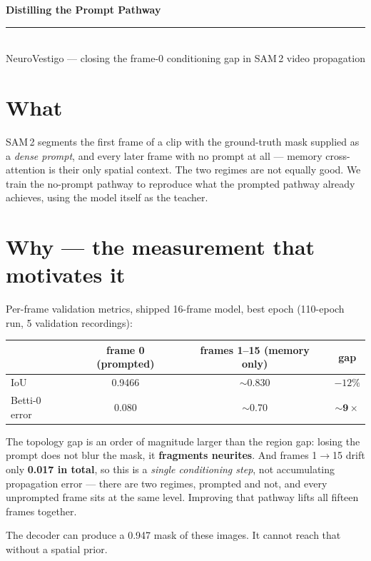 \documentclass[9pt,a4paper]{extarticle}
\begin{document}
{\Large\bfseries Distilling the Prompt Pathway}\\[1pt]
{\color{acc}\rule{\textwidth}{1pt}}\\[2pt]
{\small NeuroVestigo --- closing the frame-0 conditioning gap in SAM\,2 video propagation}

\section{What}
SAM\,2 segments the first frame of a clip with the ground-truth mask supplied as a \emph{dense prompt}, and every
later frame with no prompt at all --- memory cross-attention is their only spatial context. The two regimes are
not equally good. We train the no-prompt pathway to reproduce what the prompted pathway already achieves, using
the model itself as the teacher.

\section{Why --- the measurement that motivates it}
Per-frame validation metrics, shipped 16-frame model, best epoch (110-epoch run, 5 validation recordings):

\begin{center}
\begin{tabular}{lccc}
\toprule
 & frame 0 (prompted) & frames 1--15 (memory only) & gap \\
\midrule
IoU            & 0.9466 & $\sim$0.830 & $-12\%$ \\
Betti-0 error  & 0.080  & $\sim$0.70  & $\mathbf{\sim 9\times}$ \\
\bottomrule
\end{tabular}
\end{center}

The topology gap is an order of magnitude larger than the region gap: losing the prompt does not blur the mask,
it \textbf{fragments neurites}. And frames 1$\to$15 drift only \textbf{0.017 in total}, so this is a \emph{single
conditioning step}, not accumulating propagation error --- there are two regimes, prompted and not, and every
unprompted frame sits at the same level. Improving that pathway lifts all fifteen frames together.

The decoder can produce a 0.947 mask of these images. It cannot reach that without a spatial prior.
\end{document}
